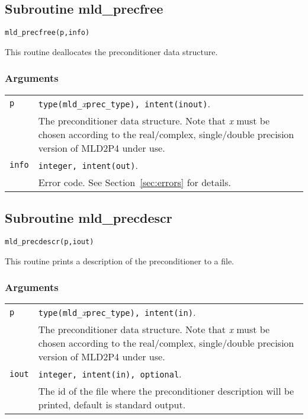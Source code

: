 \subsection{Subroutine mld\_precfree\label{sec:precfree}}

\begin{center}
\verb|mld_precfree(p,info)|\\
\end{center}

\noindent
This routine deallocates the preconditioner data structure.

\subsubsection*{Arguments}

\begin{tabular}{p{1.2cm}p{11.5cm}}
\verb|p|      & \verb|type(mld_|\emph{x}\verb|prec_type), intent(inout)|.\\
              & The preconditioner data structure. Note that \emph{x} must be chosen according
                to the real/complex, single/double precision version of MLD2P4 under use.\\
\verb|info|   & \verb|integer, intent(out)|.\\
              & Error code. See Section~\ref{sec:errors} for details.\\
\end{tabular}


\subsection{Subroutine mld\_precdescr\label{sec:precdescr}}

\begin{center}
\verb|mld_precdescr(p,iout)|\\
\end{center}

\noindent
This routine prints a description of the preconditioner
to a file.

\subsubsection*{Arguments}

\begin{tabular}{p{1.2cm}p{10.6cm}}
\verb|p|      & \verb|type(mld_|\emph{x}\verb|prec_type), intent(in)|.\\
              & The preconditioner data structure. Note that \emph{x} must be chosen according
                to the real/complex, single/double precision version of MLD2P4 under use.\\
\verb|iout|   & \verb|integer, intent(in), optional|.\\
              & The id of the file where the preconditioner description
                will be printed, default is  standard output.\\
\end{tabular}

